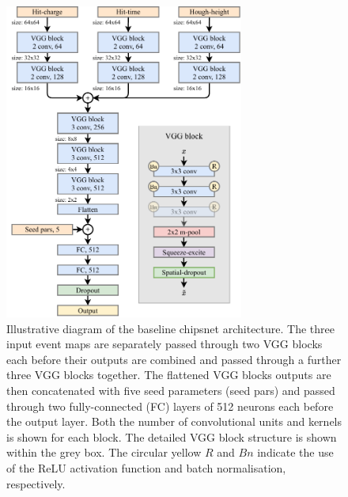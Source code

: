 \begin{figure} %
    \includegraphics[width=0.7\textwidth]{diagrams/6-cnn/chipsnet.pdf}
    \caption[Illustrative diagram of the baseline chipsnet architecture]
    {Illustrative diagram of the baseline chipsnet architecture. The three input event maps are
        separately passed through two VGG blocks each before their outputs are combined and passed
        through a further three VGG blocks together. The flattened VGG blocks outputs are then
        concatenated with five seed parameters (seed pars) and passed through two fully-connected
        (FC) layers of 512 neurons each before the output layer. Both the number of convolutional
        units and kernels is shown for each block. The detailed VGG block structure is shown
        within the grey box. The circular yellow $R$ and $Bn$ indicate the use of the ReLU
        activation function and batch normalisation, respectively.}
    \label{fig:chipsnet}
\end{figure}

